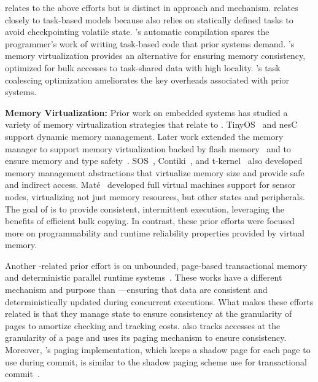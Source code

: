\sys relates to the above efforts but is distinct in approach and mechanism. \sys relates closely to task-based models because \sys also relies on statically defined tasks to avoid checkpointing volatile state. \sys's automatic compilation spares the programmer's work of writing task-based code that prior systems demand. \sys's memory virtualization provides an alternative for ensuring memory consistency, optimized for bulk accesses to task-shared data with high locality. \sys's task coalescing optimization ameliorates the key overheads associated with prior systems.

{{\noindent \bf Memory Virtualization:}} Prior work on embedded systems has studied a variety of memory virtualization strategies that relate to \sys. TinyOS~\cite{levis2005tinyos} and nesC~\cite{nesc} support dynamic memory management. Later work extended the memory manager to support memory virtualization backed by flash memory~\cite{sensornetvm} and to ensure memory and type safety~\cite{tinyosmemorysafety}. SOS~\cite{sos}, Contiki~\cite{contiki}, and
t-kernel~\cite{tkernel} also developed memory management abstractions that
virtualize memory size and provide safe and indirect access. Mat\'e~\cite{mate} developed full virtual machines support for sensor nodes, virtualizing not just memory resources, but other states and peripherals. The goal of \sys is to provide consistent, intermittent execution, leveraging the benefits of efficient bulk copying. In contrast, these prior efforts were focused more on programmability and runtime reliability properties provided by virtual memory.

Another \sys-related prior effort is on unbounded, page-based transactional memory and deterministic parallel runtime systems~\cite{pagebasedtm,grace}. These works have a different mechanism and purpose than \sys---ensuring that data are consistent and
deterministically updated during concurrent executions. What makes these
efforts related is that they manage state to ensure consistency at the
granularity of pages to amortize checking and tracking costs. \sys also tracks
accesses at the granularity of a page and uses its paging mechanism to ensure
consistency. Moreover, \sys's paging implementation, which keeps a shadow page
for each page to use during commit, is similar to the shadow paging scheme
use for transactional commit~\cite{pagebasedtm}.